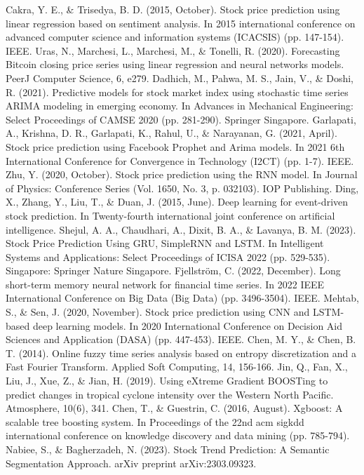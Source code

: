\documentclass{ieeeojies}
\begin{document}
\begin{thebibliography}{00}
Cakra, Y. E., \& Trisedya, B. D. (2015, October). Stock price prediction using linear regression based on sentiment analysis. In 2015 international conference on advanced computer science and information systems (ICACSIS) (pp. 147-154). IEEE.
Uras, N., Marchesi, L., Marchesi, M., \& Tonelli, R. (2020). Forecasting Bitcoin closing price series using linear regression and neural networks models. PeerJ Computer Science, 6, e279.
Dadhich, M., Pahwa, M. S., Jain, V., \& Doshi, R. (2021). Predictive models for stock market index using stochastic time series ARIMA modeling in emerging economy. In Advances in Mechanical Engineering: Select Proceedings of CAMSE 2020 (pp. 281-290). Springer Singapore.
Garlapati, A., Krishna, D. R., Garlapati, K., Rahul, U., \& Narayanan, G. (2021, April). Stock price prediction using Facebook Prophet and Arima models. In 2021 6th International Conference for Convergence in Technology (I2CT) (pp. 1-7). IEEE.
Zhu, Y. (2020, October). Stock price prediction using the RNN model. In Journal of Physics: Conference Series (Vol. 1650, No. 3, p. 032103). IOP Publishing.
Ding, X., Zhang, Y., Liu, T., \& Duan, J. (2015, June). Deep learning for event-driven stock prediction. In Twenty-fourth international joint conference on artificial intelligence.
Shejul, A. A., Chaudhari, A., Dixit, B. A., \& Lavanya, B. M. (2023). Stock Price Prediction Using GRU, SimpleRNN and LSTM. In Intelligent Systems and Applications: Select Proceedings of ICISA 2022 (pp. 529-535). Singapore: Springer Nature Singapore.
Fjellström, C. (2022, December). Long short-term memory neural network for financial time series. In 2022 IEEE International Conference on Big Data (Big Data) (pp. 3496-3504). IEEE.
Mehtab, S., \& Sen, J. (2020, November). Stock price prediction using CNN and LSTM-based deep learning models. In 2020 International Conference on Decision Aid Sciences and Application (DASA) (pp. 447-453). IEEE.
Chen, M. Y., \& Chen, B. T. (2014). Online fuzzy time series analysis based on entropy discretization and a Fast Fourier Transform. Applied Soft Computing, 14, 156-166.
Jin, Q., Fan, X., Liu, J., Xue, Z., \& Jian, H. (2019). Using eXtreme Gradient BOOSTing to predict changes in tropical cyclone intensity over the Western North Pacific. Atmosphere, 10(6), 341.
Chen, T., \& Guestrin, C. (2016, August). Xgboost: A scalable tree boosting system. In Proceedings of the 22nd acm sigkdd international conference on knowledge discovery and data mining (pp. 785-794).
Nabiee, S., \& Bagherzadeh, N. (2023). Stock Trend Prediction: A Semantic Segmentation Approach. arXiv preprint arXiv:2303.09323.



\end{thebibliography}
\end{document}
